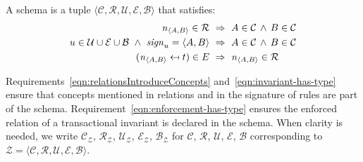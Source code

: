 \documentclass[runningheads]{llncs}
\newcommand{\id}[1]{\text{\it #1\/}}
\newcommand{\sign}[1]{\id{sign}_{#1}}
\newcommand{\declare}[3]{\id{#1}_{\pair{#2}{#3}}}
\newcommand{\pair}[2]{\langle{#1},{#2}\rangle}
\newcommand{\quintuple}[5]{\langle{#1},{#2},{#3},{#4},{#5}\rangle}
\newcommand{\concepts}{\mathcal{C}}
\newcommand{\rels}{\mathcal{R}}   %
\newcommand{\rules}{\mathcal{U}}
\newcommand{\transactions}{\mathcal{E}}
\newcommand{\busConstraints}{\mathcal{B}}
\newcommand{\schema}{\mathscr{Z}}
\begin{document}
   \begin{definition}[Schema]
   A schema is a tuple $\quintuple{\concepts}{\rels}{\rules}{\transactions}{\busConstraints}$ that satisfies:
\begin{align}
   \declare{n}{A}{B}\in\rels&~\Rightarrow~ A\in\concepts\,\wedge\, B\in\concepts
   \label{eqn:relationsIntroduceConcepts}\\
   u\in\rules\cup\transactions\cup\busConstraints\ \wedge\ \sign{u}=\pair{A}{B}&~\Rightarrow~A\in\concepts\,\wedge\, B\in\concepts\label{eqn:invariant-has-type}\\
   (\declare{n}{A}{B}\mapsfrom t)\in\mathcal\transactions&~\Rightarrow~ \declare{n}{A}{B}\in \rels\label{eqn:enforcement-has-type}
\end{align}
   \end{definition}
   Requirements~\ref{eqn:relationsIntroduceConcepts} and~\ref{eqn:invariant-has-type} ensure that concepts mentioned in relations and in the signature of rules are part of the schema.
   Requirement~\ref{eqn:enforcement-has-type} ensures the enforced relation of a transactional invariant is declared in the schema. 
   When clarity is needed, we write $\concepts_{\schema}$, $\rels_{\schema}$, $\rules_{\schema}$, $\transactions_{\schema}$, $\busConstraints_{\schema}$
   for $\concepts$, $\rels$, $\rules$, $\transactions$, $\busConstraints$ corresponding to $\schema = \quintuple{\concepts}{\rels}{\rules}{\transactions}{\busConstraints}$.
\end{document}
